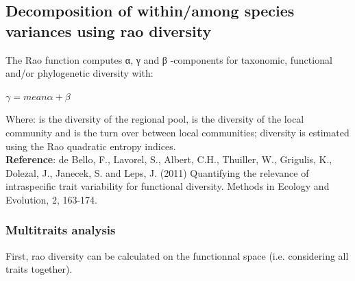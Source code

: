 \documentclass[12pt]{article}\usepackage[]{graphicx}\usepackage[]{color}
\begin{document}
\subsection{Decomposition of within/among species variances using rao diversity}

The Rao function computes α, γ and β -components for taxonomic, functional and/or phylogenetic diversity with:

\begin{center}
$\gamma = mean \alpha + \beta$
\end{center}

Where: \gamma is the diversity of the regional pool, \alpha is the diversity of the local community and \beta is the turn over between local communities; diversity is estimated using the Rao quadratic entropy indices.
\\

\textbf{Reference}: de Bello, F., Lavorel, S., Albert, C.H., Thuiller, W., Grigulis, K., Dolezal, J., Janecek, S. and Leps, J. (2011) Quantifying the relevance of intraspecific trait variability for functional diversity. Methods in Ecology and Evolution, 2, 163-174.


\subsubsection{Multitraits analysis}
First, rao diversity can be calculated on the functionnal space (i.e. considering all traits together).
\end{document}
